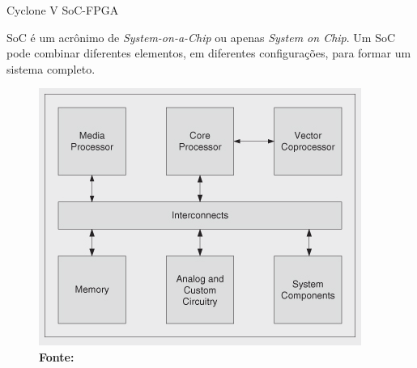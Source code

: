 \documentclass[10pt]{beamer}
\begin{document}
\begin{frame}{Cyclone V SoC-FPGA}
		\vspace{0.1cm}
		\begin{justify}
			SoC é um acrônimo de \textit{System-on-a-Chip} ou apenas \textit{System on Chip}. Um SoC pode combinar diferentes elementos, em diferentes configurações, para formar um sistema completo.
		\end{justify}
		
		\begin{figure}[h]
			\begin{center}
				\includegraphics[scale=0.395]{imagens/basicsoc.png}\\
				{\footnotesize \textbf{Fonte:}}
			\end{center}
			\label{fig:SoC}
		\end{figure}
\end{frame}
\end{document}
